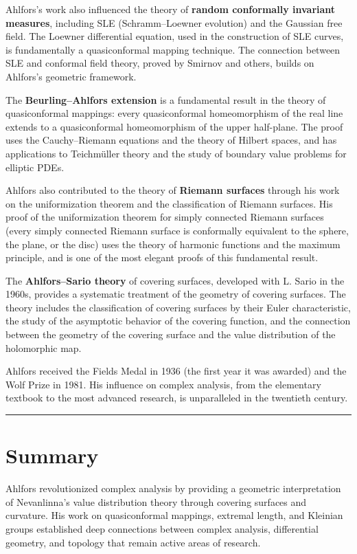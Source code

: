 Ahlfors's work also influenced the theory of \textbf{random conformally invariant measures}, including SLE (Schramm--Loewner evolution) and the Gaussian free field. The Loewner differential equation, used in the construction of SLE curves, is fundamentally a quasiconformal mapping technique. The connection between SLE and conformal field theory, proved by Smirnov and others, builds on Ahlfors's geometric framework.

The \textbf{Beurling--Ahlfors extension} is a fundamental result in the theory of quasiconformal mappings: every quasiconformal homeomorphism of the real line extends to a quasiconformal homeomorphism of the upper half-plane. The proof uses the Cauchy--Riemann equations and the theory of Hilbert spaces, and has applications to Teichm\"{u}ller theory and the study of boundary value problems for elliptic PDEs.

Ahlfors also contributed to the theory of \textbf{Riemann surfaces} through his work on the uniformization theorem and the classification of Riemann surfaces. His proof of the uniformization theorem for simply connected Riemann surfaces (every simply connected Riemann surface is conformally equivalent to the sphere, the plane, or the disc) uses the theory of harmonic functions and the maximum principle, and is one of the most elegant proofs of this fundamental result.

The \textbf{Ahlfors--Sario theory} of covering surfaces, developed with L. Sario in the 1960s, provides a systematic treatment of the geometry of covering surfaces. The theory includes the classification of covering surfaces by their Euler characteristic, the study of the asymptotic behavior of the covering function, and the connection between the geometry of the covering surface and the value distribution of the holomorphic map.

Ahlfors received the Fields Medal in 1936 (the first year it was awarded) and the Wolf Prize in 1981. His influence on complex analysis, from the elementary textbook to the most advanced research, is unparalleled in the twentieth century.

\begin{center}\rule{0.5\linewidth}{0.5pt}\end{center}

\section*{Summary}

Ahlfors revolutionized complex analysis by providing a geometric interpretation of Nevanlinna's value distribution theory through covering surfaces and curvature. His work on quasiconformal mappings, extremal length, and Kleinian groups established deep connections between complex analysis, differential geometry, and topology that remain active areas of research.
